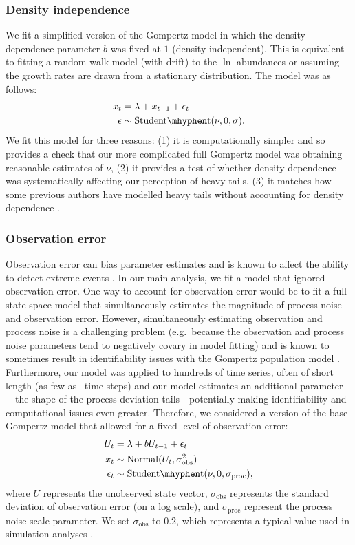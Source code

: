 \subsubsection{Density independence} We fit a simplified version of the
Gompertz model in which the density dependence parameter \(b\) was fixed at
\(1\) (density independent). This is equivalent to fitting a random walk model
(with drift) to the \(\ln\) abundances or assuming the growth rates are drawn
from a stationary distribution. The model was as follows:
\begin{align}
x_t &= \lambda + x_{t-1} + \epsilon_t\\
\epsilon &\sim \mathrm{Student\mhyphen t}(\nu, 0, \sigma).
\end{align}
We fit this model for three reasons: (1) it is computationally simpler and so
provides a check that our more complicated full Gompertz model was obtaining
reasonable estimates of \(\nu\), (2) it provides a test of whether density
dependence was systematically affecting our perception of heavy tails, (3) it
matches how some previous authors have modelled heavy tails without accounting
for density dependence \citep{segura2013}.

\subsubsection{Observation error} Observation error can bias parameter
estimates \citep{knape2012} and is known to affect the ability to detect extreme
events \citep{ward2007}. In our main analysis, we fit a model that ignored
observation error. One way to account for observation error would be to fit a
full state-space model that simultaneously estimates the magnitude of process
noise and observation error. However, simultaneously estimating observation and
process noise is a challenging problem (e.g.\ because the observation and
process noise parameters tend to negatively covary in model fitting) and is
known to sometimes result in identifiability issues with the Gompertz
population model \citep{knape2008}. Furthermore, our model was applied to
hundreds of time series, often of short length (as few as \minTimeSteps\ time
steps) and our model estimates an additional parameter---the shape of the
process deviation tails---potentially making identifiability and computational
issues even greater. Therefore, we considered a version of the base Gompertz
model that allowed for a fixed level of observation error:
\begin{align}
U_t &= \lambda + b U_{t-1} + \epsilon_t\\
x_t &\sim \mathrm{Normal}(U_t, \sigma_\mathrm{obs}^2)\\
\epsilon_t &\sim \mathrm{Student\mhyphen t}(\nu, 0, \sigma_\mathrm{proc}),
\end{align}
where \(U\) represents the unobserved state vector, \(\sigma_\mathrm{obs}\)
represents the standard deviation of observation error (on a log scale), and
\(\sigma_\mathrm{proc}\) represent the process noise scale parameter. We set
\(\sigma_\mathrm{obs}\) to \(0.2\), which represents a typical value used in
simulation analyses \citep{valpine2002, thorson2014b}.

